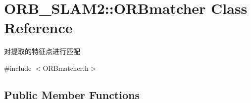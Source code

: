 \hypertarget{class_o_r_b___s_l_a_m2_1_1_o_r_bmatcher}{}\section{O\+R\+B\+\_\+\+S\+L\+A\+M2\+:\+:O\+R\+Bmatcher Class Reference}
\label{class_o_r_b___s_l_a_m2_1_1_o_r_bmatcher}


对提取的特征点进行匹配  




{\ttfamily \#include $<$O\+R\+Bmatcher.\+h$>$}

\subsection*{Public Member Functions}
